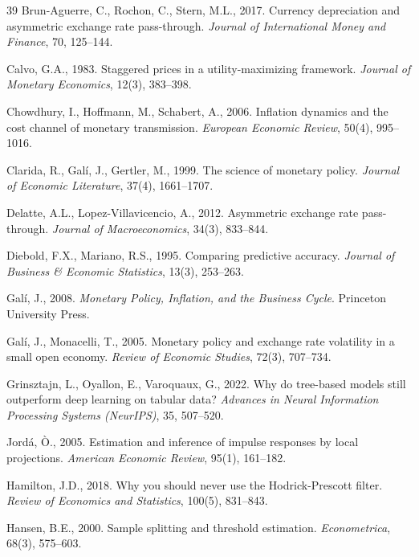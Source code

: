\documentclass[review,12pt]{elsarticle}
\begin{document}
\begin{thebibliography}{39}
Brun-Aguerre, C., Rochon, C., Stern, M.L., 2017. Currency depreciation and
asymmetric exchange rate pass-through. \textit{Journal of International Money
and Finance}, 70, 125--144.

Calvo, G.A., 1983. Staggered prices in a utility-maximizing framework.
\textit{Journal of Monetary Economics}, 12(3), 383--398.

Chowdhury, I., Hoffmann, M., Schabert, A., 2006. Inflation dynamics and the
cost channel of monetary transmission. \textit{European Economic Review},
50(4), 995--1016.

Clarida, R., Gal{\'i}, J., Gertler, M., 1999. The science of monetary policy.
\textit{Journal of Economic Literature}, 37(4), 1661--1707.

Delatte, A.L., Lopez-Villavicencio, A., 2012. Asymmetric exchange rate
pass-through. \textit{Journal of Macroeconomics}, 34(3), 833--844.

Diebold, F.X., Mariano, R.S., 1995. Comparing predictive accuracy.
\textit{Journal of Business \& Economic Statistics}, 13(3), 253--263.

Gal{\'i}, J., 2008. \textit{Monetary Policy, Inflation, and the Business
Cycle}. Princeton University Press.

Gal{\'i}, J., Monacelli, T., 2005. Monetary policy and exchange rate volatility
in a small open economy. \textit{Review of Economic Studies}, 72(3), 707--734.

Grinsztajn, L., Oyallon, E., Varoquaux, G., 2022. Why do tree-based models still
outperform deep learning on tabular data? \textit{Advances in Neural Information
Processing Systems (NeurIPS)}, 35, 507--520.

Jord{\'a}, {\`O}., 2005. Estimation and inference of impulse responses by local projections.
\textit{American Economic Review}, 95(1), 161--182.

Hamilton, J.D., 2018. Why you should never use the Hodrick-Prescott filter.
\textit{Review of Economics and Statistics}, 100(5), 831--843.

Hansen, B.E., 2000. Sample splitting and threshold estimation. \textit{Econometrica},
68(3), 575--603.


\end{thebibliography}
\end{document}
